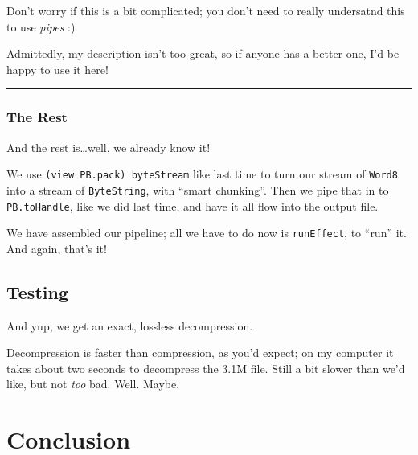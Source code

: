 \documentclass[]{article}
\newenvironment{Shaded}{}{}
\newcommand{\KeywordTok}[1]{\textcolor[rgb]{0.00,0.44,0.13}{\textbf{{#1}}}}
\newcommand{\CommentTok}[1]{\textcolor[rgb]{0.38,0.63,0.69}{\textit{{#1}}}}
\newcommand{\NormalTok}[1]{{#1}}
\begin{document}
Don't worry if this is a bit complicated; you don't need to really undersatnd
this to use \emph{pipes} :)

Admittedly, my description isn't too great, so if anyone has a better one, I'd
be happy to use it here!

\begin{center}\rule{0.5\linewidth}{\linethickness}\end{center}

\subsubsection{The Rest}\label{the-rest}

And the rest is\ldots{}well, we already know it!

We use \texttt{(view\ PB.pack)\ byteStream} like last time to turn our stream of
\texttt{Word8} into a stream of \texttt{ByteString}, with ``smart chunking''.
Then we pipe that in to \texttt{PB.toHandle}, like we did last time, and have it
all flow into the output file.

We have assembled our pipeline; all we have to do now is \texttt{runEffect}, to
``run'' it. And again, that's it!

\subsection{Testing}\label{testing}

\begin{Shaded}
\end{Shaded}

And yup, we get an exact, lossless decompression.

Decompression is faster than compression, as you'd expect; on my computer it
takes about two seconds to decompress the 3.1M file. Still a bit slower than
we'd like, but not \emph{too} bad. Well. Maybe.

\section{Conclusion}\label{conclusion}
\end{document}

